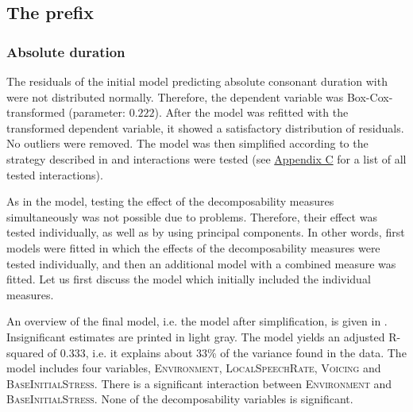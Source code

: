 \subsection{The prefix } \label{corpus results dis}


\subsubsection{Absolute duration}

The residuals of the initial model predicting absolute consonant duration with  were not distributed normally. Therefore, the dependent variable was Box-Cox-transformed (parameter:  $0.222$). After the model was refitted with the transformed dependent variable, it showed a satisfactory distribution of residuals. No outliers were removed. The model was then simplified according to the strategy described in   and interactions were tested (see \hyperref[Appendix C: Summaries of tested interactions in corpus study]{Appendix C} for a list of all tested interactions).

As in the model, testing the effect of the decomposability measures simultaneously was not possible due to  problems. Therefore, their effect was tested individually, as well as by using principal components. In other words, first models were fitted in which the effects of the decomposability measures were tested individually, and then an additional model with a combined  measure was fitted. 
 Let us first discuss the model which initially included the individual measures.

An overview of the final model, i.e. the model after simplification, is given in . Insignificant estimates are printed in light gray. The model yields an adjusted R-squared of  0.333, i.e. it explains about 33\% of the variance found in the data. The model includes four variables, \textsc{Environment}, \textsc{LocalSpeechRate}, \textsc{Voicing} and \textsc{BaseInitialStress}. There is a significant interaction between \textsc{Environment} and \textsc{BaseInitialStress}. None of the decomposability variables is significant.


